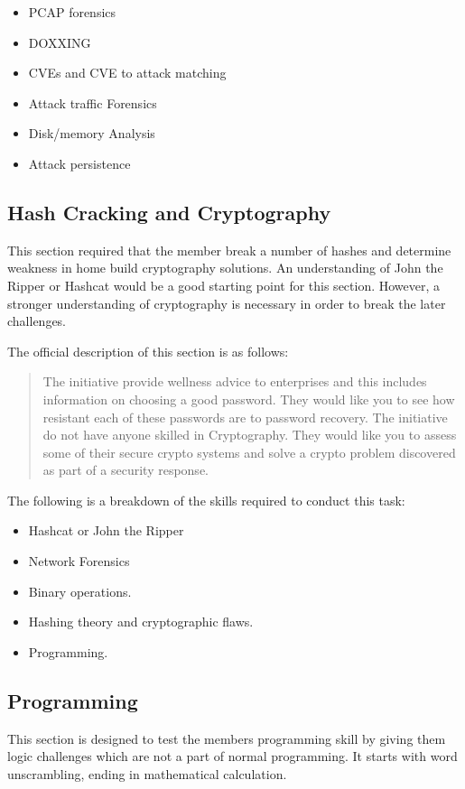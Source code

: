 \documentclass[a4paper,11pt]{report}
\begin{document}
			\begin{itemize}
				\item PCAP forensics
				\item DOXXING
				\item CVEs and CVE to attack matching
				\item Attack traffic Forensics
				\item Disk/memory Analysis
				\item Attack persistence
			\end{itemize}
		\subsection{Hash Cracking and Cryptography}
			This section required that the member break a number of hashes and determine weakness in home build cryptography solutions. 
			An understanding of John the Ripper or Hashcat would be a good starting point for this section. 
			However, a stronger understanding of cryptography is necessary in order to break the later challenges. 
			
			The official description of this section is as follows:
			\begin{quote}
				The initiative provide wellness advice to enterprises and this includes information on choosing a good password. They would like you to see how resistant each of these passwords are to password recovery. The initiative do not have anyone skilled in Cryptography. They would like you to assess some of their secure crypto systems and solve a crypto problem discovered as part of a security response.
			\end{quote}

			The following is a breakdown of the skills required to conduct this task:
			\begin{itemize}
				\item Hashcat or John the Ripper
				\item Network Forensics
				\item Binary operations. 
				\item Hashing theory and cryptographic flaws.
				\item Programming.
			\end{itemize}

		\subsection{Programming}
			This section is designed to test the members programming skill by giving them logic challenges which are not a part of normal programming. 
			It starts with word unscrambling, ending in mathematical calculation. 
			
\end{document}
